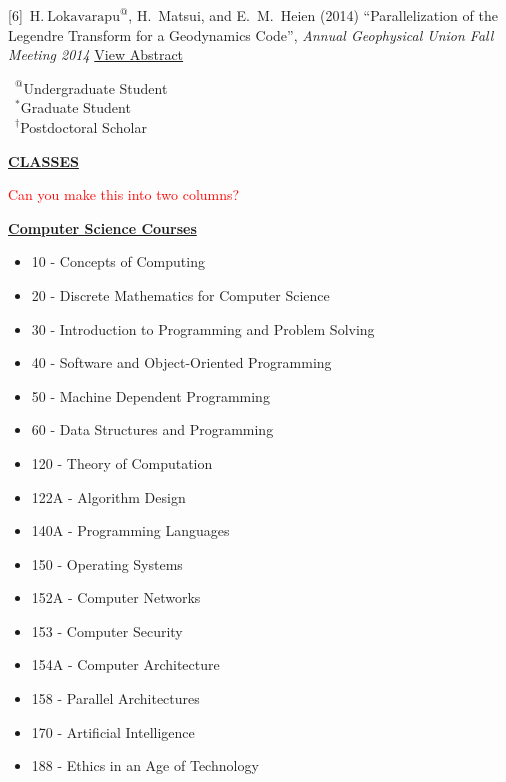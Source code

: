 \documentclass[11pt]{ltxdoc}
\begin{document}
\hangindent 20pt
[6]~$\mathrm{H.~Lokavarapu}^{@}$, H.~Matsui, and E.~M.~Heien (2014) 
``Parallelization of the Legendre Transform for a Geodynamics Code'', 
\textit{Annual Geophysical Union Fall Meeting 2014}
\href{http://adsabs.harvard.edu/abs/2014AGUFMDI11A4255L}{View Abstract}

\vskip 18pt

$\phantom{0}^@$Undergraduate Student        \\
$\phantom{0}^*$Graduate Student             \\
$\phantom{0}^{\dagger}$Postdoctoral Scholar

\newpage

\begin{center}
  \textbf{\underline{CLASSES}}
\end{center}

\textcolor{red}{Can you make this into two columns?}

\noindent
\textbf{\underline{Computer Science Courses}}
\begin{itemize}
  \item 10 - Concepts of Computing
  \item 20 - Discrete Mathematics for Computer Science
  \item 30 - Introduction to Programming and Problem Solving
  \item 40 - Software and Object-Oriented Programming
  \item 50 - Machine Dependent Programming
  \item 60 - Data Structures and Programming
  \item 120 - Theory of Computation
  \item 122A - Algorithm Design
  \item 140A - Programming Languages
  \item 150 - Operating Systems
  \item 152A - Computer Networks
  \item 153 - Computer Security
  \item 154A - Computer Architecture
  \item 158 - Parallel Architectures
  \item 170 - Artificial Intelligence
  \item 188 - Ethics in an Age of Technology
\end{itemize}
\end{document}
